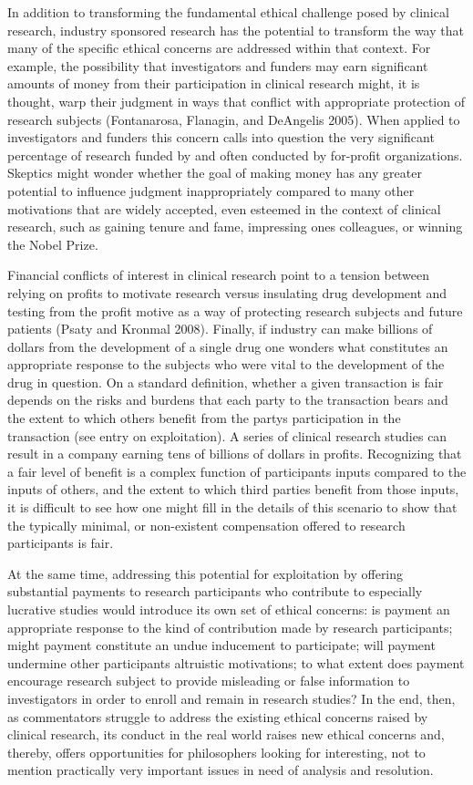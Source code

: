 \documentclass[12p]{article}
\begin{document}
In addition to transforming the fundamental ethical challenge posed by clinical research, industry sponsored research has the potential to transform the way that many of the specific ethical concerns are addressed within that context. For example, the possibility that investigators and funders may earn significant amounts of money from their participation in clinical research might, it is thought, warp their judgment in ways that conflict with appropriate protection of research subjects (Fontanarosa, Flanagin, and DeAngelis 2005). When applied to investigators and funders this concern calls into question the very significant percentage of research funded by and often conducted by for-profit organizations. Skeptics might wonder whether the goal of making money has any greater potential to influence judgment inappropriately compared to many other motivations that are widely accepted, even esteemed in the context of clinical research, such as gaining tenure and fame, impressing ones colleagues, or winning the Nobel Prize.

Financial conflicts of interest in clinical research point to a tension between relying on profits to motivate research versus insulating drug development and testing from the profit motive as a way of protecting research subjects and future patients (Psaty and Kronmal 2008). Finally, if industry can make billions of dollars from the development of a single drug one wonders what constitutes an appropriate response to the subjects who were vital to the development of the drug in question. On a standard definition, whether a given transaction is fair depends on the risks and burdens that each party to the transaction bears and the extent to which others benefit from the partys participation in the transaction (see entry on exploitation). A series of clinical research studies can result in a company earning tens of billions of dollars in profits. Recognizing that a fair level of benefit is a complex function of participants inputs compared to the inputs of others, and the extent to which third parties benefit from those inputs, it is difficult to see how one might fill in the details of this scenario to show that the typically minimal, or non-existent compensation offered to research participants is fair.

At the same time, addressing this potential for exploitation by offering substantial payments to research participants who contribute to especially lucrative studies would introduce its own set of ethical concerns: is payment an appropriate response to the kind of contribution made by research participants; might payment constitute an undue inducement to participate; will payment undermine other participants altruistic motivations; to what extent does payment encourage research subject to provide misleading or false information to investigators in order to enroll and remain in research studies? In the end, then, as commentators struggle to address the existing ethical concerns raised by clinical research, its conduct in the real world raises new ethical concerns and, thereby, offers opportunities for philosophers looking for interesting, not to mention practically very important issues in need of analysis and resolution. 
\end{document}
